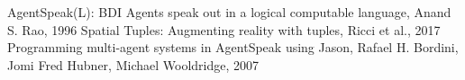 \documentclass[12pt,a4paper,openright,twoside]{report}
\theoremstyle{plain}
\theoremstyle{definition}
\begin{document}


\makeatletter
\renewcommand\@bibitem[1]
{
  \item\if@filesw \immediate\write\@auxout
  {\string\bibcite{#1}{Bib. \the\value{\@listctr}}}\fi\ignorespaces
}%
\def\@biblabel#1{[Bib. #1]}%
\makeatother

\begin{thebibliography}{90} %
\rhead[\fancyplain{}{\bfseries \leftmark}]{\fancyplain{}{\bfseries \thepage}}


 AgentSpeak(L): BDI Agents speak out in a logical computable language, Anand S. Rao, 1996
 Spatial Tuples: Augmenting reality with tuples, Ricci et al., 2017
 Programming multi-agent systems in AgentSpeak using Jason, Rafael H. Bordini, Jomi Fred Hubner, Michael Wooldridge, 2007

\end{thebibliography}


\makeatletter
\let\@orig@endthebibliography\endthebibliography
\renewcommand\endthebibliography
{
  \xdef\@kept@last@number{\the\c@enumiv}%
  \@orig@endthebibliography
}

\newenvironment{thesitography}[1]
{\def\bibname{Sitografia}%
   \thebibliography{#1}%
}
{\@orig@endthebibliography}

\renewcommand\@bibitem[1]
{
  \item\if@filesw \immediate\write\@auxout
  {\string\bibcite{#1}{Sit. \the\value{\@listctr}}}\fi\ignorespaces
}%
\def\@biblabel#1{[Sit. #1]}%
\makeatother
\end{document}
